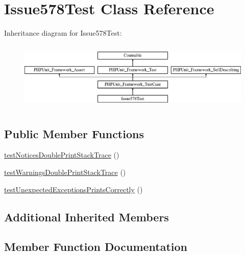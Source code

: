 \hypertarget{class_issue578_test}{}\section{Issue578\+Test Class Reference}
\label{class_issue578_test}
Inheritance diagram for Issue578\+Test\+:\begin{figure}[H]
\begin{center}
\leavevmode
\includegraphics[height=3.303835cm]{class_issue578_test}
\end{center}
\end{figure}
\subsection*{Public Member Functions}
\begin{DoxyCompactItemize}
\item 
\mbox{\hyperlink{class_issue578_test_add92662716b7eeed0ce44b1c9e60841d}{test\+Notices\+Double\+Print\+Stack\+Trace}} ()
\item 
\mbox{\hyperlink{class_issue578_test_a98402aa7e9d05ef5275d79341ed10c00}{test\+Warnings\+Double\+Print\+Stack\+Trace}} ()
\item 
\mbox{\hyperlink{class_issue578_test_a791655035657b903ce8ada462e6ebd27}{test\+Unexpected\+Exceptions\+Prints\+Correctly}} ()
\end{DoxyCompactItemize}
\subsection*{Additional Inherited Members}


\subsection{Member Function Documentation}
\mbox{\label{class_issue578_test_add92662716b7eeed0ce44b1c9e60841d}} 
